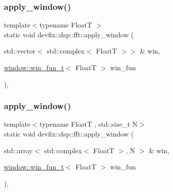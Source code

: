 \subsubsection{\texorpdfstring{apply\+\_\+window()}{apply\_window()}\hspace{0.1cm}{\footnotesize\ttfamily [5/6]}}
{\footnotesize\ttfamily template$<$typename FloatT $>$ \\
static void devfix\+::dsp\+::fft\+::apply\+\_\+window (\begin{DoxyParamCaption}\item[{std\+::vector$<$ std\+::complex$<$ FloatT $>$$>$ \&}]{win,  }\item[{\hyperlink{structdevfix_1_1dsp_1_1window_ab2d2c0c5f5fca6dbcf91895115b69eac}{window\+::win\+\_\+fun\+\_\+t}$<$ FloatT $>$}]{win\+\_\+fun }\end{DoxyParamCaption})\hspace{0.3cm}{\ttfamily [inline]}, {\ttfamily [static]}}

\mbox{\label{structdevfix_1_1dsp_1_1fft_ab3fa5daba56a4dccfa7bef3b980f0866}} 
\subsubsection{\texorpdfstring{apply\+\_\+window()}{apply\_window()}\hspace{0.1cm}{\footnotesize\ttfamily [6/6]}}
{\footnotesize\ttfamily template$<$typename FloatT , std\+::size\+\_\+t N$>$ \\
static void devfix\+::dsp\+::fft\+::apply\+\_\+window (\begin{DoxyParamCaption}\item[{std\+::array$<$ std\+::complex$<$ FloatT $>$, N $>$ \&}]{win,  }\item[{\hyperlink{structdevfix_1_1dsp_1_1window_ab2d2c0c5f5fca6dbcf91895115b69eac}{window\+::win\+\_\+fun\+\_\+t}$<$ FloatT $>$}]{win\+\_\+fun }\end{DoxyParamCaption})\hspace{0.3cm}{\ttfamily [inline]}, {\ttfamily [static]}}

\mbox{\label{structdevfix_1_1dsp_1_1fft_a6ed95d078d9828e160e6d9911c253b5f}} 
